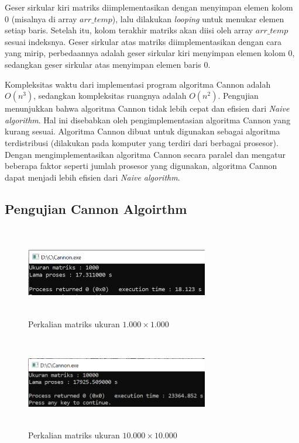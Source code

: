 \documentclass[conference]{IEEEtran}
\begin{document}
Geser sirkular kiri matriks diimplementasikan dengan menyimpan elemen kolom 0 (misalnya di array $arr\_temp$), lalu dilakukan \textit{looping} untuk menukar elemen setiap baris.
Setelah itu, kolom terakhir matriks akan diisi oleh array $arr\_temp$ sesuai indeksnya.
Geser sirkular atas matriks diimplementasikan dengan cara yang mirip, 
perbedaannya adalah geser sirkular kiri menyimpan elemen kolom 0, sedangkan geser sirkular atas menyimpan elemen baris 0.

Kompleksitas waktu dari implementasi program algoritma Cannon adalah $O(n^3)$, 
sedangkan kompleksitas ruangnya adalah $O(n^2)$.
Pengujian menunjukkan bahwa algoritma Cannon tidak lebih cepat dan efisien dari \textit{Naive algorithm}.
Hal ini disebabkan oleh pengimplementasian algoritma Cannon yang kurang sesuai.
Algoritma Cannon dibuat untuk digunakan sebagai algoritma terdistribusi (dilakukan pada komputer yang terdiri dari berbagai prosesor).
Dengan mengimplementasikan algoritma Cannon secara paralel dan mengatur beberapa faktor seperti jumlah prosesor yang digunakan, algoritma Cannon dapat menjadi lebih efisien dari \textit{Naive algorithm}.

\subsection{Pengujian Cannon Algoirthm}

\begin{figure}[h]
    \includegraphics[width = 8cm, height = 4cm]{Cannon_1000.png}
    \centering
    \caption{Perkalian matriks ukuran $1.000\times1.000$}
 \end{figure}
 
 \begin{figure}[h]
    \includegraphics[width = 8cm, height = 4cm]{Cannon_10000.png}
    \centering
    \caption{Perkalian matriks ukuran $10.000\times10.000$}
 \end{figure}
\end{document}
